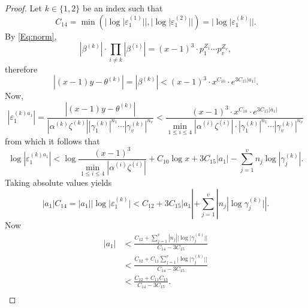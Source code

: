 {\begin{proof}
Let $k \in \{1,2\}$ be an index such that 
\[C_{14} = \min \left( |\log|\varepsilon_1^{(1)}||, |\log|\varepsilon_1^{(2)}||\right) = |\log|\varepsilon_1^{(k)}||. \]
By \eqref{Eq:norm}, 
\[|\beta^{(k)}| \cdot \prod_{i \neq k}|\beta^{(i)}| = (x-1)^3\cdot p_1^{Z_1}\cdots p_v^{Z_v}, \]
therefore
\[|(x-1)y-\theta^{(k)}| = |\beta^{(k)}| < (x-1)^3\cdot x^{C_{10}} \cdot e^{3C_{15}|a_1|}.\]
Now, 
\[|\varepsilon_1^{(k)a_1}|
= \frac{|(x-1)y-\theta^{(k)}|}{|\alpha^{(k)}\zeta^{(k)}||\gamma_1^{(k)}|^{n_1}\cdots |\gamma_v^{(k)}|^{n_v}}
< \frac{(x-1)^3\cdot x^{C_{10}} \cdot e^{3C_{15}|a_1|}}{\displaystyle \min_{1\leq i \leq 4}|\alpha^{(i)}\zeta^{(i)}| 		\cdot |\gamma_1^{(k)}|^{n_1}\cdots |\gamma_v^{(k)}|^{n_v}}\]
from which it follows that
\[\log|\varepsilon_1^{(k)a_1}| 
< \log{\frac{(x-1)^3}{\displaystyle \min_{1\leq i \leq 4}|\alpha^{(i)}\zeta^{(i)}|}} +  C_{10}\log{x} + 3C_{15}|a_1|- \sum_{j = 1}^v n_j \log|\gamma_j^{(k)}|.\]
Taking absolute values yields
\[|a_1|C_{14} = |a_1| |\log|\varepsilon_1^{(k)}| < C_{12} + 3C_{15}|a_1| + \sum_{j = 1}^v |n_j|\log{\gamma_j^{(k)}|}|.\]
Now
\[\begin{split}
|a_1| 
& < \frac{C_{12} +\displaystyle\sum_{j = 1}^v |n_j||\log|\gamma_j^{(k)}||}{C_{14} - 3C_{15}}\\
& < \frac{C_{12} +C_{11}\displaystyle\sum_{j = 1}^v |\log|\gamma_j^{(k)}||}{C_{14} - 3C_{15}}\\
& < \frac{C_{12} +C_{11}C_{13}}{C_{14} - 3C_{15}}.\\
\end{split}\]


\end{proof}}
